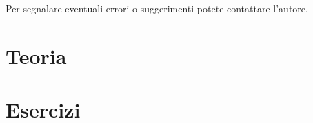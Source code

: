 \documentclass[10pt,a4paper,twoside]{book}
\begin{document}

Per segnalare eventuali errori o suggerimenti potete contattare l'autore.

\newpage


\tableofcontents



\AtEndDocument{\cleardoublepage}


\mainmatter
\pagestyle{fancy} %


\part{Teoria}


\part{Esercizi}

\end{document}
